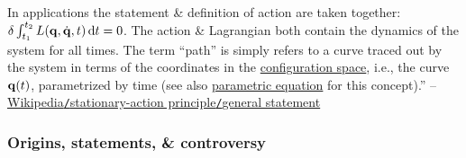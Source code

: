 \documentclass{article}
\begin{document}
In applications the statement \& definition of action are taken together: $\delta\int_{t_1}^{t_2} L({\bf q},\dot{\bf q},t)\,{\rm d}t = 0$. The action \& Lagrangian both contain the dynamics of the system for all times. The term ``path'' is simply refers to a curve traced out by the system in terms of the coordinates in the \href{https://en.wikipedia.org/wiki/Configuration_space_(physics)}{configuration space}, i.e., the curve ${\bf q}(t)$, parametrized by time (see also \href{https://en.wikipedia.org/wiki/Parametric_equation}{parametric equation} for this concept).'' -- \href{https://en.wikipedia.org/wiki/Stationary-action_principle#General_statement}{Wikipedia{\tt/}stationary-action principle{\tt/}general statement}

\subsubsection{Origins, statements, \& controversy}
\end{document}
